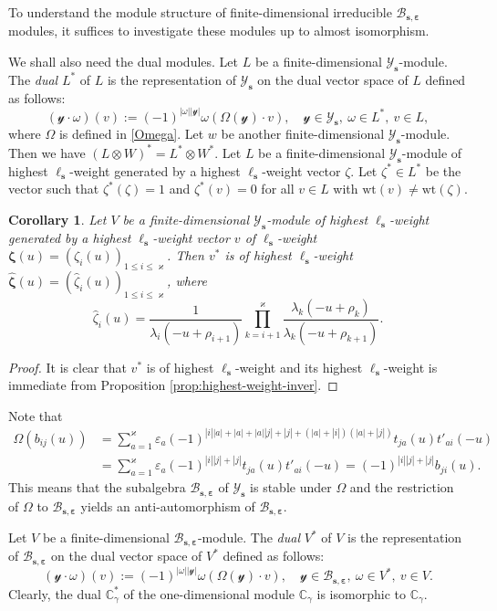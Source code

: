 \documentclass[11pt,reqno]{amsart}
\numberwithin{equation}{section}
\newtheorem{cor}[thm]{Corollary}
\theoremstyle{definition}
\theoremstyle{remark}
\newcommand{\C}{\mathbb{C}}
\newcommand{\mc}{\mathcal}
\newcommand{\lle}{\leqslant}
\newcommand{\la}{\lambda}
\newcommand{\YglMN}{\mathscr{Y}_{\bm s}}
\newcommand{\YMN}{{\mathscr{Y}_{\bm s}}}
\newcommand{\BMN}{{\mathscr{B}_{\bm s,\bm \ve}}}
\newcommand{\wt}{\widehat}
\newcommand{\ka}{\varkappa}
\newcommand{\ve}{\varepsilon}
\newcommand{\s}{{\bm s}}
\begin{document}
To understand the module structure of finite-dimensional irreducible $\BMN$ modules, it suffices to investigate these modules up to almost isomorphism.

We shall also need the dual modules.
Let $L$ be a finite-dimensional $\YglMN$-module. The \textit{dual} $L^*$ of $L$ is the representation of $\YglMN$ on the dual vector space of $L$ defined as follows:
\[
(\mc y\cdot \omega)(v):=(-1)^{|\omega||\mc y|}\omega(\Omega(\mc y)\cdot v),\quad  \mc y\in \YglMN,\ \omega\in L^* ,\ v\in L,
\]
where $\Omega$ is defined in \eqref{Omega}. Let $w$ be another finite-dimensional $\YglMN$-module. Then we have $(L\otimes W)^*=L^*\otimes W^*$.                                                                            Let $L$ be a finite-dimensional $\YglMN$-module of highest $\ell_\s$-weight generated by a highest $\ell_\s$-weight vector $\zeta$. Let $\zeta^*\in L^*$ be the vector such that $\zeta^*(\zeta)=1$ and $\zeta^*(v)=0$ for all $v\in L$ with $\mathrm{wt}(v)\ne \mathrm{wt}(\zeta)$. %

\begin{cor}\label{cor dual weight}
Let $V$ be a finite-dimensional $\YglMN$-module of highest $\ell_\s$-weight generated by a highest $\ell_\s$-weight vector $v$ of $\ell_\s$-weight $\bm\zeta(u)=(\zeta_i(u))_{1\lle i\lle \ka}$. Then $v^*$ is of highest $\ell_\s$-weight $\wt{\bm{\zeta}}(u)=(\wt\zeta_i(u))_{1\lle i\lle \ka}$, where
\[
\wt\zeta_i(u)=\frac{1}{\la_{i}(-u+\rho_{i+1})}\prod_{k=i+1}^\ka \frac{\la_k(-u+\rho_k)}{\la_{k}(-u+\rho_{k+1})}.
\]
\end{cor}
\begin{proof}
It is clear that $v^*$ is of highest $\ell_\s$-weight and its highest $\ell_\s$-weight is immediate from Proposition \ref{prop:highest-weight-inver}.
\end{proof}

Note that
\begin{align*}
\Omega(b_{ij}(u))&=\sum_{a=1}^\ka\ve_a(-1)^{|i||a|+|a|+|a||j|+|j|+(|a|+|i|)(|a|+|j|)}t_{ja}(u)t'_{ai}(-u)\\
&= \sum_{a=1}^\ka\ve_a(-1)^{|i||j|+|j|}t_{ja}(u)t'_{ai}(-u)=(-1)^{|i||j|+|j|}b_{ji}(u).
\end{align*}
This means that the subalgebra $\BMN$ of $\YMN$ is stable under $\Omega$ and the restriction of $\Omega$ to $\BMN$ yields an anti-automorphism of $\BMN$.

Let $V$ be a finite-dimensional $\BMN$-module. The \textit{dual} $V^*$ of $V$ is the representation of $\BMN$ on the dual vector space of $V^*$ defined as follows:
\[
(\mc y\cdot \omega)(v):=(-1)^{|\omega||\mc y|}\omega(\Omega(\mc y)\cdot v),\quad  \mc y\in \BMN,\ \omega\in V^* ,\ v\in V.
\]
Clearly, the dual $\C_{\gamma}^*$ of the one-dimensional module $\C_{\gamma}$ is isomorphic to $\C_\gamma$.
\end{document}
